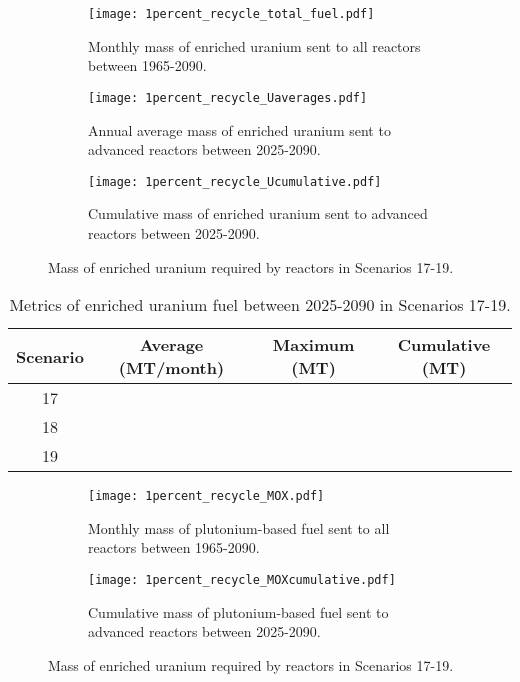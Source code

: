 \begin{figure}[h!]
    \centering
    \begin{subfigure}[b]{0.45\textwidth}
        \centering
        \texttt{[image: 1percent\_recycle\_total\_fuel.pdf]}
        \caption{Monthly mass of enriched uranium sent to all reactors 
        between 1965-2090.}
        \label{fig:1percent_recycle_all_uranium}
    \end{subfigure}
    \hfill
    \begin{subfigure}[b]{0.45\textwidth}
        \centering
        \texttt{[image: 1percent\_recycle\_Uaverages.pdf]}
        \caption{Annual average mass of enriched uranium sent to 
        advanced reactors between 2025-2090.}
        \label{fig:1percent_recycle_AR_uranium}
    \end{subfigure}
    \begin{subfigure}[b]{0.45\textwidth}
        \centering
        \texttt{[image: 1percent\_recycle\_Ucumulative.pdf]}
        \caption{Cumulative mass of enriched 
        uranium sent to advanced reactors between 2025-2090.}
        \label{fig:1percent_recycle_uranium_cumulative}
    \end{subfigure}
       \caption{Mass of enriched uranium required by reactors
        in Scenarios 17-19.}
       \label{fig:1percent_recycle_uranium}
\end{figure}

\begin{table}[h!]
    \centering 
    \caption{Metrics of enriched uranium fuel between 2025-2090 in Scenarios 
    17-19.}
    \label{tab:enrichedu_17-19}
    \begin{tabular}{c c c c}
        \hline 
        Scenario & Average (MT/month) & Maximum (MT) & Cumulative (MT) \\
        \hline
        17 &  &  & \\
        18 &  &  & \\
        19 &  &  & \\
        \hline
    \end{tabular}
\end{table}

\begin{figure}[h!]
    \centering
    \begin{subfigure}[b]{0.45\textwidth}
        \centering
        \texttt{[image: 1percent\_recycle\_MOX.pdf]}
        \caption{Monthly mass of plutonium-based fuel sent to all reactors 
        between 1965-2090.}
        \label{fig:1percent_recycle_AR_mox}
    \end{subfigure}
    \hfill
    \begin{subfigure}[b]{0.45\textwidth}
        \centering
        \texttt{[image: 1percent\_recycle\_MOXcumulative.pdf]}
        \caption{Cumulative mass of plutonium-based fuel 
        sent to advanced reactors between 2025-2090.}
        \label{fig:1percent_recycle_mox_cumulative}
    \end{subfigure}
       \caption{Mass of enriched uranium required by reactors
        in Scenarios 17-19.}
       \label{fig:1percent_recycle_mox}
\end{figure}

